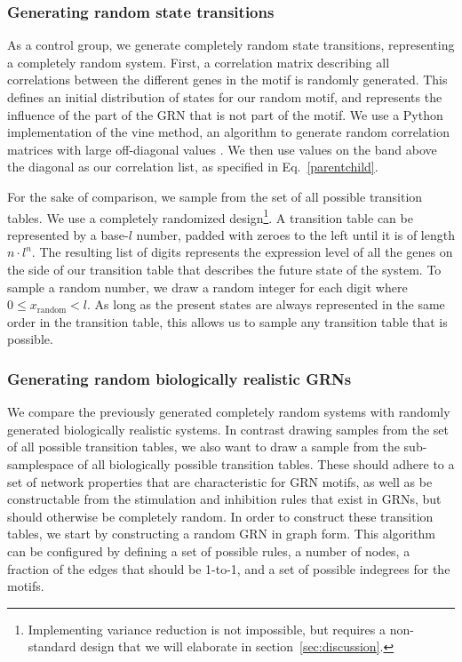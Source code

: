 \documentclass[../main.tex]{subfiles}
\begin{document}
\subsubsection{Generating random state transitions}

As a control group, we generate completely random state transitions, representing a completely random system.
First, a correlation matrix describing all correlations between the different genes in the motif is randomly generated.
This defines an initial distribution of states for our random motif, and represents the influence of the part of the GRN that is not part of the motif.
We use a Python implementation of the vine method, an algorithm to generate random correlation matrices with large off-diagonal values \cite{lewandowski2009generating}.
We then use values on the band above the diagonal as our correlation list, as specified in Eq.~\ref{parentchild}. %

For the sake of comparison, we sample from the set of all possible transition tables.
We use a completely randomized design\footnote{Implementing variance reduction is not impossible, but requires a non-standard design that we will elaborate in section~\ref{sec:discussion}.}.
A transition table can be represented by a base-$l$ number, padded with zeroes to the left until it is of length $n \cdot l^n$.
The resulting list of digits represents the expression level of all the genes on the side of our transition table that describes the future state of the system.
To sample a random number, we draw a random integer for each digit where $0 \le x_\mathrm{random} < l$.
As long as the present states are always represented in the same order in the transition table, this allows us to sample any transition table that is possible.

\subsubsection{Generating random biologically realistic GRNs}

We compare the previously generated completely random systems with randomly generated biologically realistic systems.
In contrast drawing samples from the set of all possible transition tables, we also want to draw a sample from the sub-samplespace of all biologically possible transition tables.
These should adhere to a set of network properties that are characteristic for GRN motifs, as well as be constructable from the stimulation and inhibition rules that exist in GRNs, but should otherwise be completely random.
In order to construct these transition tables, we start by constructing a random GRN in graph form.
This algorithm can be configured by defining a set of possible rules, a number of nodes, a fraction of the edges that should be 1-to-1, and a set of possible indegrees for the motifs.
\end{document}
